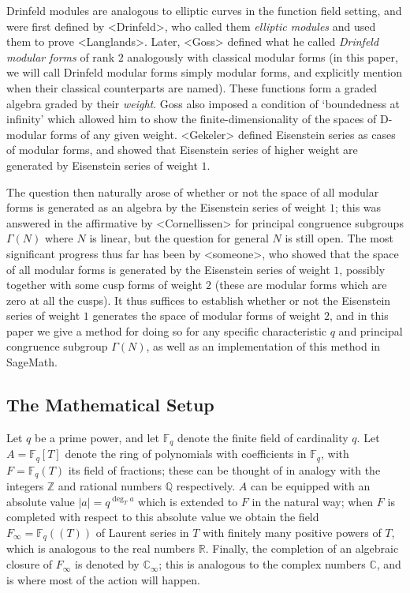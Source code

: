\documentclass{article}
\newcommand*{\ZZ}{\mathbb{Z}}
\newcommand*{\QQ}{\mathbb{Q}}
\newcommand*{\RR}{\mathbb{R}}
\newcommand*{\CC}{\mathbb{C}}
\newcommand*{\CCi}{\mathbb{C}_\infty}
\newcommand*{\FF}{\mathbb{F}}
\newcommand*{\abs}[1]{\left\lvert#1\right\rvert}
\begin{document}
Drinfeld modules are analogous to elliptic curves in the function field setting, and were first defined by <Drinfeld>, who called them \emph{elliptic modules} and used them to prove <Langlands>.
Later, <Goss> defined what he called \emph{Drinfeld modular forms} of rank $2$ analogously with classical modular forms (in this paper, we will call Drinfeld modular forms simply modular forms, and explicitly mention when their classical counterparts are named).
These functions form a graded algebra graded by their \emph{weight}.
Goss also imposed a condition of `boundedness at infinity' which allowed him to show the finite-dimensionality of the spaces of D-modular forms of any given weight.
<Gekeler> defined Eisenstein series as cases of modular forms, and showed that Eisenstein series of higher weight are generated by Eisenstein series of weight $1$.

The question then naturally arose of whether or not the space of all modular forms is generated as an algebra by the Eisenstein series of weight $1$; this was answered in the affirmative by <Cornellissen> for principal congruence subgroups $\Gamma(N)$ where $N$ is linear, but the question for general $N$ is still open.
The most significant progress thus far has been by <someone>, who showed that the space of all modular forms is generated by the Eisenstein series of weight $1$, possibly together with some cusp forms of weight $2$ (these are modular forms which are zero at all the cusps).
It thus suffices to establish whether or not the Eisenstein series of weight $1$ generates the space of modular forms of weight $2$, and in this paper we give a method for doing so for any specific characteristic $q$ and principal congruence subgroup $\Gamma(N)$, as well as an implementation of this method in SageMath.


\subsection{The Mathematical Setup} \label{ssec:msetup}
Let $q$ be a prime power, and let $\FF_q$ denote the finite field of cardinality $q$.
Let $A = \FF_q[T]$ denote the ring of polynomials with coefficients in $\FF_q$, with $F = \FF_q(T)$ its field of fractions; these can be thought of in analogy with the integers $\ZZ$ and rational numbers $\QQ$ respectively.
$A$ can be equipped with an absolute value $\abs{a} = q^{\deg_T a}$ which is extended to $F$ in the natural way; when $F$ is completed with respect to this absolute value we obtain the field $F_\infty = \FF_q((T))$ of Laurent series in $T$ with finitely many positive powers of $T$, which is analogous to the real numbers $\RR$.
Finally, the completion of an algebraic closure of $F_\infty$ is denoted by $\CCi$; this is analogous to the complex numbers $\CC$, and is where most of the action will happen.
\end{document}
